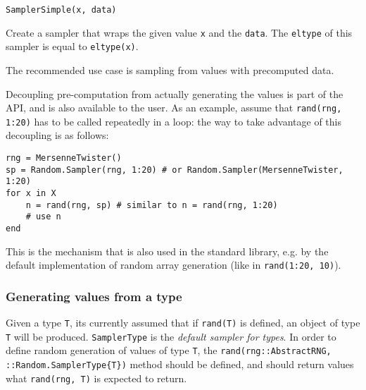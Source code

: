 \begin{adjustwidth}{2em}{0pt}


\begin{verbatim}
SamplerSimple(x, data)
\end{verbatim}

Create a sampler that wraps the given value \texttt{x} and the \texttt{data}. The \texttt{eltype} of this sampler is equal to \texttt{eltype(x)}.

The recommended use case is sampling from values with precomputed data.



\end{adjustwidth}

Decoupling pre-computation from actually generating the values is part of the API, and is also available to the user. As an example, assume that \texttt{rand(rng, 1:20)} has to be called repeatedly in a loop: the way to take advantage of this decoupling is as follows:




\begin{verbatim}
rng = MersenneTwister()
sp = Random.Sampler(rng, 1:20) # or Random.Sampler(MersenneTwister, 1:20)
for x in X
    n = rand(rng, sp) # similar to n = rand(rng, 1:20)
    # use n
end
\end{verbatim}



This is the mechanism that is also used in the standard library, e.g. by the default implementation of random array generation (like in \texttt{rand(1:20, 10)}).



\hypertarget{15852577436081724496}{}


\subsubsection{Generating values from a type}



Given a type \texttt{T}, it{\textquotesingle}s currently assumed that if \texttt{rand(T)} is defined, an object of type \texttt{T} will be produced. \texttt{SamplerType} is the \emph{default sampler for types}. In order to define random generation of values of type \texttt{T}, the \texttt{rand(rng::AbstractRNG, ::Random.SamplerType\{T\})} method should be defined, and should return values what \texttt{rand(rng, T)} is expected to return.



